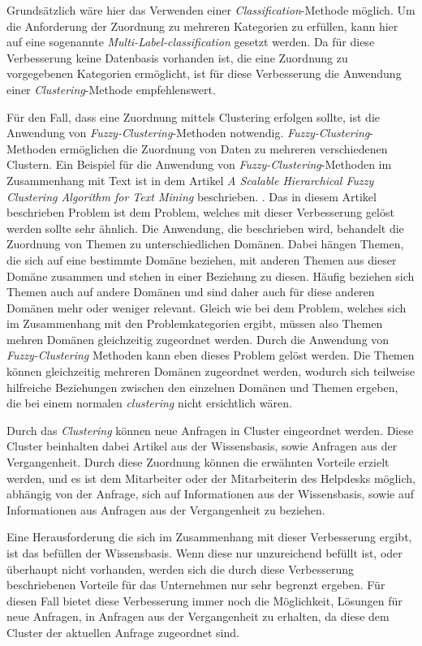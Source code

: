 Grundsätzlich wäre hier das Verwenden einer \textit{Classification}-Methode möglich. Um die Anforderung der Zuordnung zu mehreren Kategorien zu erfüllen, kann hier auf eine sogenannte \textit{Multi-Label-classification} gesetzt werden. Da für diese Verbesserung keine Datenbasis vorhanden ist, die eine Zuordnung zu vorgegebenen Kategorien ermöglicht, ist für diese Verbesserung die Anwendung einer \textit{Clustering}-Methode empfehlenswert.

Für den Fall, dass eine Zuordnung mittels Clustering erfolgen sollte, ist die Anwendung von \textit{Fuzzy-Clustering}-Methoden notwendig. \textit{Fuzzy-Clustering}-Methoden ermöglichen die Zuordnung von Daten zu mehreren verschiedenen Clustern. Ein Beispiel für die Anwendung von \textit{Fuzzy-Clustering}-Methoden im Zusammenhang mit Text ist in dem Artikel \textit{A Scalable Hierarchical Fuzzy Clustering Algorithm for Text Mining} beschrieben. \cite{rodrigues2004scalable}. Das in diesem Artikel beschrieben Problem ist dem Problem, welches mit dieser Verbesserung gelöst werden sollte sehr ähnlich. Die Anwendung, die beschrieben wird, behandelt die Zuordnung von Themen zu unterschiedlichen Domänen. Dabei hängen Themen, die sich auf eine bestimmte Domäne beziehen, mit anderen Themen aus dieser Domäne zusammen und stehen in einer Beziehung zu diesen. Häufig beziehen sich Themen auch auf andere Domänen und sind daher auch für diese anderen Domänen mehr oder weniger relevant. Gleich wie bei dem Problem, welches sich im Zusammenhang mit den Problemkategorien ergibt, müssen also Themen mehren Domänen gleichzeitig zugeordnet werden. Durch die Anwendung von \textit{Fuzzy-Clustering} Methoden kann eben dieses Problem gelöst werden. Die Themen können gleichzeitig mehreren Domänen zugeordnet werden, wodurch sich teilweise hilfreiche Beziehungen zwischen den einzelnen Domänen und Themen ergeben, die bei einem normalen \textit{clustering} nicht ersichtlich wären.

Durch das \textit{Clustering} können neue Anfragen in Cluster eingeordnet werden. Diese Cluster beinhalten dabei Artikel aus der Wissensbasis, sowie Anfragen aus der Vergangenheit. Durch diese Zuordnung können die erwähnten Vorteile erzielt werden, und es ist dem Mitarbeiter oder der Mitarbeiterin des Helpdesks möglich, abhängig von der Anfrage, sich auf Informationen aus der Wissensbasis, sowie auf Informationen aus Anfragen aus der Vergangenheit zu beziehen.

Eine Herausforderung die sich im Zusammenhang mit dieser Verbesserung ergibt, ist das befüllen der Wissensbasis. Wenn diese nur unzureichend befüllt ist, oder überhaupt nicht vorhanden, werden sich die durch diese Verbesserung beschriebenen Vorteile für das Unternehmen nur sehr begrenzt ergeben. Für diesen Fall bietet diese Verbesserung immer noch die Möglichkeit, Lösungen für neue Anfragen, in Anfragen aus der Vergangenheit zu erhalten, da diese dem Cluster der aktuellen Anfrage zugeordnet sind.

